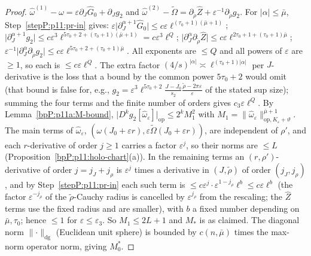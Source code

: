 \begin{proof}
\label{stepP:p11:pr-c} $\hat\omega^{(1)}-\omega=\varepsilon\partial_J\hat G_0+\partial_Jg_2$ and $\hat\omega^{(2)}-\tilde\Omega=\partial_{\tilde\rho}\hat Z+\varepsilon^{-1}\partial_{\tilde\rho}g_2$. For $\lvert\alpha\rvert\le\bar\mu$, Step~\ref{stepP:p11:pr-in} gives: $\varepsilon\lvert\partial_J^{\alpha+1}\hat G_0\rvert\le c\varepsilon\ell^{(\tau_0+1)(\bar\mu+1)}$; $\lvert\partial_J^{\alpha+1}g_2\rvert\le c\varepsilon^3\ell^{5\tau_0+2+(\tau_0+1)(\bar\mu+1)}=c\varepsilon^3\ell^Q$; $\lvert\partial_J^\alpha\partial_{\tilde\rho}\hat Z\rvert\le c\varepsilon\ell^{2\tau_0+1+(\tau_0+1)\bar\mu}$; $\varepsilon^{-1}\lvert\partial_J^\alpha\partial_{\tilde\rho}g_2\rvert\le c\varepsilon\ell^{5\tau_0+2+(\tau_0+1)\bar\mu}$. All exponents are $\le Q$ and all powers of $\varepsilon$ are $\ge1$, so each is $\le c\varepsilon\ell^Q$. The extra factor $(4/s)^{\lvert\alpha\rvert}\asymp\ell^{(\tau_0+1)\lvert\alpha\rvert}$ per $J$-derivative is the loss that a bound by the common power $5\tau_0+2$ would omit (that bound is false for, e.g., $g_2=\varepsilon^3\ell^{5\tau_0+2}\frac{J-J_0}{s_2}\frac{\tilde\rho-2\pi\varepsilon}\varepsilon$ of the stated sup size); summing the four terms and the finite number of orders gives $c_3\varepsilon\ell^Q$.
\label{stepP:p11:pr-d} By Lemma~\ref{bpP:p11a:M-bound}, $\lvert D^kg_2[\hat\omega_\varepsilon]\rvert_{\mathrm{op}}\le2^kM_1^2$ with $M_1=\lVert\hat\omega_\varepsilon\rVert^{\bar\mu+1}_{\mathrm{op},K_\varepsilon+\vartheta}$. The main terms of $\hat\omega_\varepsilon$, $(\omega(J_0+\varepsilon r),\varepsilon\tilde\Omega(J_0+\varepsilon r))$, are independent of $\rho'$, and each $r$-derivative of order $j\ge1$ carries a factor $\varepsilon^j$, so their norms are $\le L$ (Proposition~\ref{bpP:p11:holo-chart}(a)). In the remaining terms an $(r,\rho')$-derivative of order $j=j_J+j_\rho$ is $\varepsilon^{j}$ times a derivative in $(J,\tilde\rho)$ of order $(j_J,j_\rho)$, and by Step~\ref{stepP:p11:pr-in} each such term is $\le c\varepsilon^{j}\cdot\varepsilon^{1-j_\rho}\ell^{b}\le c\varepsilon\ell^b$ (the factor $\varepsilon^{-j_\rho}$ of the $\tilde\rho$-Cauchy radius is cancelled by $\varepsilon^{j_\rho}$ from the rescaling; the $\hat Z$ terms use the fixed radius and are smaller), with $b$ a fixed number depending on $\bar\mu,\tau_0$; hence $\le1$ for $\varepsilon\le\varepsilon_3$. So $M_1\le2L+1$ and $M_*$ is as claimed. The diagonal norm $\lVert\cdot\rVert_{\mathrm{dg}}$ (Euclidean unit sphere) is bounded by $c(n,\bar\mu)$ times the max-norm operator norm, giving $M_0^*$.
\end{proof}

